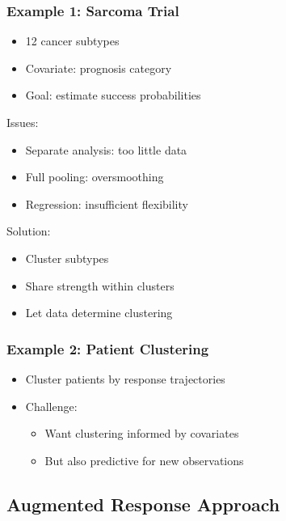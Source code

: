 \documentclass[12pt,oneside]{book}
\numberwithin{equation}{section}
\theoremstyle{definition}
\theoremstyle{plain}
\theoremstyle{remark}
\begin{document}
\subsubsection{Example 1: Sarcoma Trial}

\begin{itemize}
\item 12 cancer subtypes
\item Covariate: prognosis category
\item Goal: estimate success probabilities
\end{itemize}

Issues:
\begin{itemize}
\item Separate analysis: too little data
\item Full pooling: oversmoothing
\item Regression: insufficient flexibility
\end{itemize}

Solution:
\begin{itemize}
\item Cluster subtypes
\item Share strength within clusters
\item Let data determine clustering
\end{itemize}

\subsubsection{Example 2: Patient Clustering}

\begin{itemize}
\item Cluster patients by response trajectories

\item Challenge:
\begin{itemize}
\item Want clustering informed by covariates
\item But also predictive for new observations
\end{itemize}
\end{itemize}

\subsection*{Augmented Response Approach}
\end{document}
